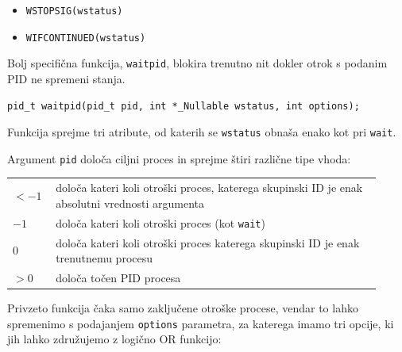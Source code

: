 \documentclass[a4paper,12pt,openright]{book}
\begin{document}
\begin{itemize}
	\item \texttt{WSTOPSIG(wstatus)}
	\item \texttt{WIFCONTINUED(wstatus)}
\end{itemize}

Bolj specifična funkcija, \texttt{waitpid}, blokira trenutno nit dokler otrok s podanim PID ne spremeni stanja.

\begin{lstlisting}[style=func]
	pid_t waitpid(pid_t pid, int *_Nullable wstatus, int options);
\end{lstlisting}

Funkcija sprejme tri atribute, od katerih se \texttt{wstatus} obnaša enako kot pri \texttt{wait}.

Argument \texttt{pid} določa ciljni proces in sprejme štiri različne tipe vhoda:

\begin{tabular}{ p{0.1\linewidth} p{0.82\linewidth} }
	$< -1$ & določa kateri koli otroški proces, katerega skupinski ID je enak absolutni vrednosti argumenta \\
	$-1$   & določa kateri koli otroški proces (kot \texttt{wait})                                          \\
	$0$    & določa kateri koli otroški proces katerega skupinski ID je enak trenutnemu procesu             \\    
	$> 0$  & določa točen PID procesa                                                                       
\end{tabular}

Privzeto funkcija čaka samo zaključene otroške procese, vendar to lahko spremenimo s podajanjem \texttt{options} parametra, za katerega imamo tri opcije, ki jih lahko združujemo z logično OR funkcijo:
\end{document}
